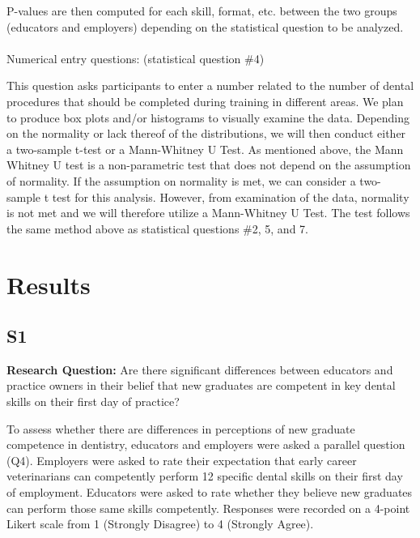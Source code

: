 \documentclass[
  12pt,
  letterpaper,
  DIV=11,
  numbers=noendperiod]{scrartcl}
\makeatletter
\let\oldparagraph\paragraph
\renewcommand{\paragraph}{
    \@ifstar
      \xxxParagraphStar
      \xxxParagraphNoStar
  }
\newcommand{\xxxParagraphStar}[1]{\oldparagraph*{#1}\mbox{}}
\newcommand{\xxxParagraphNoStar}[1]{\oldparagraph{#1}\mbox{}}
\numberwithin{figure}{section}
\numberwithin{table}{section}
\makeatother
\begin{document}
P-values are then computed for each skill, format, etc. between the two
groups (educators and employers) depending on the statistical question
to be analyzed.

\paragraph{Numerical entry questions: (statistical question
\#4)}\label{numerical-entry-questions-statistical-question-4}

This question asks participants to enter a number related to the number
of dental procedures that should be completed during training in
different areas. We plan to produce box plots and/or histograms to
visually examine the data. Depending on the normality or lack thereof of
the distributions, we will then conduct either a two-sample t-test or a
Mann-Whitney U Test. As mentioned above, the Mann Whitney U test is a
non-parametric test that does not depend on the assumption of normality.
If the assumption on normality is met, we can consider a two-sample t
test for this analysis. However, from examination of the data, normality
is not met and we will therefore utilize a Mann-Whitney U Test. The test
follows the same method above as statistical questions \#2, 5, and 7.

\section{Results}\label{results}

\subsection{S1}\label{s1}

\textbf{Research Question:} Are there significant differences between
educators and practice owners in their belief that new graduates are
competent in key dental skills on their first day of practice?

To assess whether there are differences in perceptions of new graduate
competence in dentistry, educators and employers were asked a parallel
question (Q4). Employers were asked to rate their expectation that early
career veterinarians can competently perform 12 specific dental skills
on their first day of employment. Educators were asked to rate whether
they believe new graduates can perform those same skills competently.
Responses were recorded on a 4-point Likert scale from 1 (Strongly
Disagree) to 4 (Strongly Agree).
\end{document}
